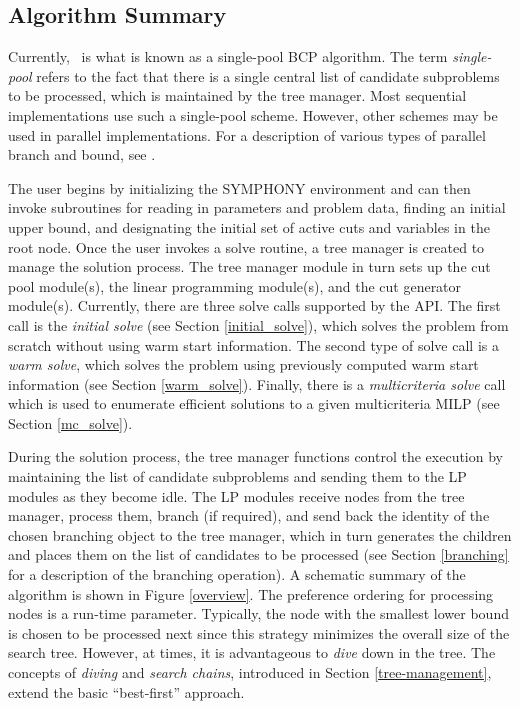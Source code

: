 \subsection{Algorithm Summary}
\label{symphony}

Currently, \BB\ is what is known as a single-pool BCP algorithm.
The term {\em single-pool} refers to the fact that there is a single
central list of candidate subproblems to be processed, which is
maintained by the tree manager. Most sequential implementations use
such a single-pool scheme. However, other schemes may be used in
parallel implementations. For a description of various types of
parallel branch and bound, see \cite{gend:paral}.

The user begins by initializing the SYMPHONY environment and can then invoke
subroutines for reading in parameters and problem data, finding an initial
upper bound, and designating the initial set of active cuts and variables in
the root node. Once the user invokes a solve routine, a tree manager is
created to manage the solution process. The tree manager module in turn sets
up the cut pool module(s), the linear programming module(s), and the cut
generator module(s). Currently, there are three solve calls supported by the
API. The first call is the \emph{initial solve} (see Section
\ref{initial_solve}), which solves the problem from scratch without using warm
start information. The second type of solve call is a \emph{warm solve}, which
solves the problem using previously computed warm start information (see
Section \ref{warm_solve}). Finally, there is a \emph{multicriteria solve} call
which is used to enumerate efficient solutions to a given multicriteria MILP
(see Section \ref{mc_solve}).

During the solution process, the tree manager functions control the execution
by maintaining the list of candidate subproblems and sending them to the LP
modules as they become idle. The LP modules receive nodes from the tree
manager, process them, branch (if required), and send back the identity of the
chosen branching object to the tree manager, which in turn generates the
children and places them on the list of candidates to be processed (see
Section \ref{branching} for a description of the branching operation). A
schematic summary of the algorithm is shown in Figure \ref{overview}. The
preference ordering for processing nodes is a run-time parameter. Typically,
the node with the smallest lower bound is chosen to be processed next since
this strategy minimizes the overall size of the search tree. However, at
times, it is advantageous to {\em dive} down in the tree. The concepts of {\em
diving} and {\em search chains}, introduced in Section \ref{tree-management},
extend the basic ``best-first'' approach.

